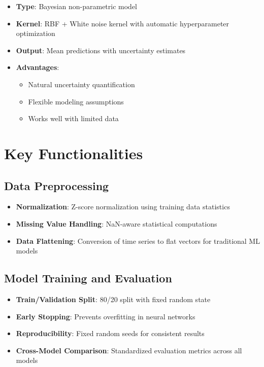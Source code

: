 \documentclass[
  letterpaper,
  DIV=11,
  numbers=noendperiod]{scrreprt}
\providecommand{\tightlist}{%
  \setlength{\itemsep}{0pt}\setlength{\parskip}{0pt}}\usepackage{longtable,booktabs,array}
\begin{document}
\begin{itemize}
\tightlist
\item
  \textbf{Type}: Bayesian non-parametric model
\item
  \textbf{Kernel}: RBF + White noise kernel with automatic
  hyperparameter optimization
\item
  \textbf{Output}: Mean predictions with uncertainty estimates
\item
  \textbf{Advantages}:

  \begin{itemize}
  \tightlist
  \item
    Natural uncertainty quantification
  \item
    Flexible modeling assumptions
  \item
    Works well with limited data
  \end{itemize}
\end{itemize}

\section{Key Functionalities}\label{key-functionalities}

\subsection{Data Preprocessing}\label{data-preprocessing}

\begin{itemize}
\tightlist
\item
  \textbf{Normalization}: Z-score normalization using training data
  statistics
\item
  \textbf{Missing Value Handling}: NaN-aware statistical computations
\item
  \textbf{Data Flattening}: Conversion of time series to flat vectors
  for traditional ML models
\end{itemize}

\subsection{Model Training and
Evaluation}\label{model-training-and-evaluation}

\begin{itemize}
\tightlist
\item
  \textbf{Train/Validation Split}: 80/20 split with fixed random state
\item
  \textbf{Early Stopping}: Prevents overfitting in neural networks
\item
  \textbf{Reproducibility}: Fixed random seeds for consistent results
\item
  \textbf{Cross-Model Comparison}: Standardized evaluation metrics
  across all models
\end{itemize}
\end{document}
